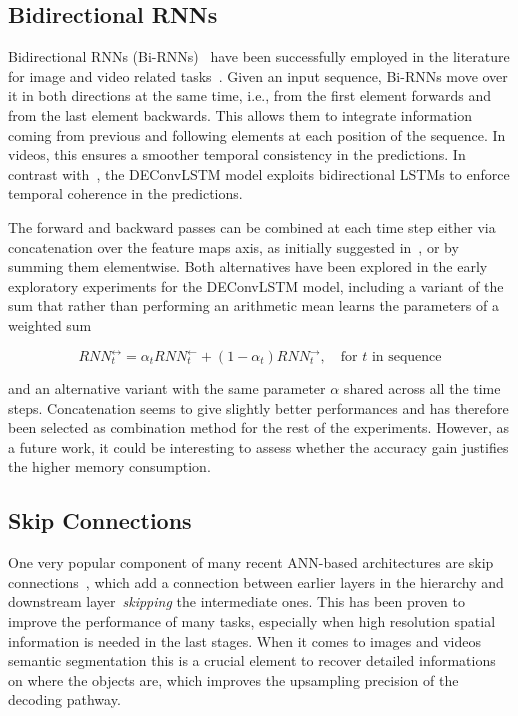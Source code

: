 \subsection{Bidirectional RNNs}\label{deconvLSTM_biRNN}
Bidirectional RNNs (Bi-RNNs)~\cite{Schuster1997bidirecrnn} have been
successfully employed in the literature for image and video related
tasks~\cite{Graves+Schmidhuber-2009,visin2015renet,Du2015_CVPR,
Visin_2016_CVPR_Workshops}. Given an input sequence, Bi-RNNs move over it in
both directions at the same time, i.e., from the first element forwards and
from the last element backwards. This allows them to integrate information
coming from previous and following elements at each position of the sequence.
In videos, this ensures a smoother temporal consistency in the predictions. In
contrast with~\cite{ShiCWYWW15}, the DEConvLSTM model exploits bidirectional
LSTMs to enforce temporal coherence in the predictions.

The forward and backward passes can be combined at each time step either via
concatenation over the feature maps axis, as initially suggested in~\cite{
Schuster1997bidirecrnn}, or by summing them elementwise. Both alternatives have
been explored in the early exploratory experiments for the DEConvLSTM model,
including a variant of the sum that rather than performing an arithmetic mean
learns the parameters of a weighted sum

\begin{equation}
    RNN_t^{\leftrightarrow} = \alpha_t RNN_t^{\leftarrow} +
        (1 - \alpha_t) RNN_t^{\rightarrow}, \quad\text{for $t$ in sequence}
\end{equation}

\noindent and an alternative variant with the same parameter $\alpha$ shared
across all the time steps. Concatenation seems to give slightly better
performances and has therefore been selected as combination method for the
rest of the experiments. However, as a future work, it could be interesting to
assess whether the accuracy gain justifies the higher memory consumption.


\subsection{Skip Connections}\label{sec:deconvLSTM_skip_connections}
One very popular component of many recent ANN-based architectures are skip
connections~\citep[see e.g.,~][]{sermanet-cvpr-13,liu2015parsenet,
long2015fully,Srivastava-et-al-arxiv2015,bell2015inside,he2015deep,
hariharan2015hypercolumns}, which add a connection between earlier layers in
the hierarchy and downstream layer~\emph{skipping} the intermediate ones. This
has been proven to improve the performance of many tasks, especially when
high resolution spatial information is needed in the last stages. When it comes
to images and videos semantic segmentation this is a crucial element to recover
detailed informations on where the objects are, which improves the upsampling
precision of the decoding pathway.

